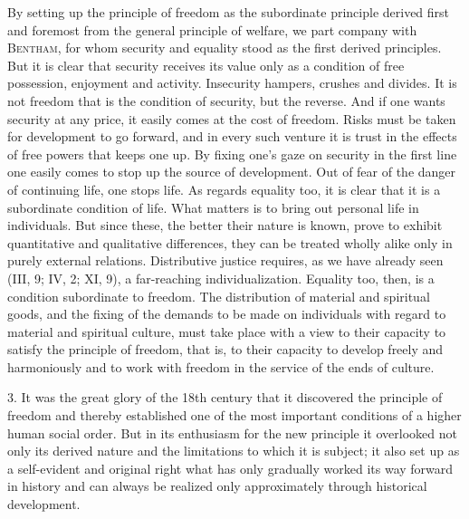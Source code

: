 \documentclass[12pt,a4paper,openany]{book}
\newcommand{\opage}[1]{\marginnote{\footnotesize\textit{[#1]}}}
\begin{document}
By setting up the principle of freedom as the subordinate principle derived first and foremost from the general
principle of welfare, we part company with \textsc{Bentham}, for whom security and equality stood as the first derived
principles. But it is clear that security receives its value only as a condition of free possession, enjoyment and
activity. Insecurity hampers, crushes and divides. It is not freedom that is the condition of security, but the reverse.
And if one wants security at any price, it easily comes at the cost of freedom. Risks must be taken for development to go
forward, and in every such venture it is trust in the effects of free powers that keeps one up. By fixing one's gaze on
security in the first line one easily comes to stop up the source of development. Out of fear of the danger of continuing
life, one stops life. As regards equality too, it is clear that it is a subordinate condition of life. What matters is to
bring out personal life in individuals. But since these, the better their nature is known, prove to exhibit quantitative
and qualitative differences, they can be treated wholly alike only in purely external relations. Distributive justice
requires, as we have already seen (III, 9; IV, 2; XI, 9), a far-reaching individualization. Equality too, then, is a
condition subordinate to freedom. The distribution of material and spiritual goods, and the fixing of the demands to be
made on individuals with regard to material and spiritual culture, must take place with a view to their capacity to
satisfy the principle of freedom, that is, to their capacity to develop freely and harmoniously and to work with freedom
in the service of the ends of culture.

3. It was the great glory of the 18th century that it discovered the principle of freedom and thereby established one of
the most important
\opage{347}conditions of a higher human social order. But in its enthusiasm for the new principle it overlooked not only
its derived nature and the limitations to which it is subject; it also set up as a self-evident and original right what
has only gradually worked its way forward in history and can always be realized only approximately through historical
development.
\end{document}
